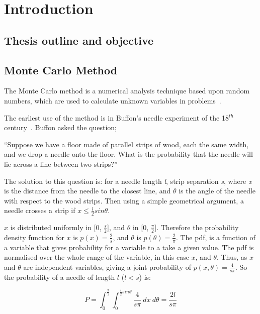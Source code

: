 \chapter{Introduction}

\section{Thesis outline and objective}


\section{Monte Carlo Method}\label{sec:mcmethod}
The Monte Carlo method is a numerical analysis technique based upon random numbers, which are used to calculate unknown variables in problems~\cite{cashwell1959practical,rogers1990monte}. 

The earliest use of the method is in Buffon's needle experiment of the 18$^{th}$ century~\cite{badger1994lazzarini,beckmann2015history,buffon1785histoire}. Buffon asked the question;

\medskip

``Suppose we have a floor made of parallel strips of wood, each the same width, and we drop a needle onto the floor. What is the probability that the needle will lie across a line between two strips?''

\medskip

The solution to this question is:
for a needle length \textit{l}, strip separation \textit{s}, where \textit{x} is the distance from the needle to the closest line, and $\theta$ is the angle of the needle with respect to the wood strips. Then using a simple geometrical argument, a needle crosses a strip if $x \leq \tfrac{l}{2} sin \theta$.

$x$ is distributed uniformly in [0, $\tfrac{s}{2}$], and $\theta$ in [0, $\tfrac{\pi}{2}$]. Therefore the probability density function for $x$ is $p(x)=\tfrac{2}{s}$, and $\theta$ is $p(\theta) = \tfrac{2}{\pi}$. The \gls*{pdf}, is a function of a variable that gives probability for a variable to a take a given value. The \gls*{pdf} is normalised over the whole range of the variable, in this case $x$, and $\theta$.
Thus, as $x$ and $\theta$ are independent variables, giving a joint probability of $p(x,\theta) = \tfrac{4}{s \pi}$.
So the probability of a needle of length $l$ ($l<s$) is:

\begin{equation}
P=\int_0^{\frac{\pi}{2}}\int_0^{\frac{l}{2}sin\theta}\frac{4}{s\pi}\ dx\ d\theta = \frac{2 l}{s \pi}\label{eqn:buffon}
\end{equation}


